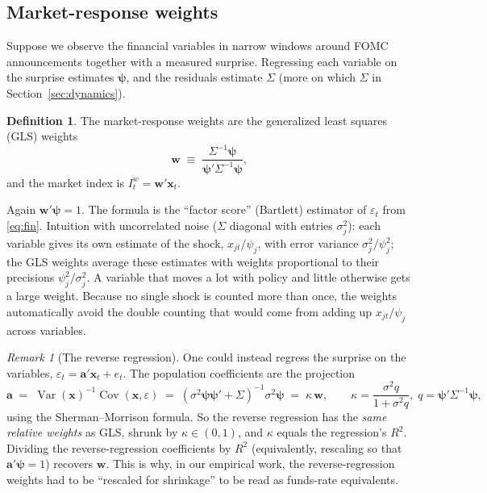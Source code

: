 \documentclass[11pt]{article}
\theoremstyle{definition}
\newtheorem{definition}{Definition}
\theoremstyle{remark}
\newtheorem*{remark}{Remark}
\newcommand{\Var}{\operatorname{Var}}
\newcommand{\Cov}{\operatorname{Cov}}
\newcommand{\bpsi}{\boldsymbol{\psi}}
\newcommand{\bx}{\mathbf{x}}
\newcommand{\bw}{\mathbf{w}}
\newcommand{\ba}{\mathbf{a}}
\begin{document}
\subsection{Market-response weights}

Suppose we observe the financial variables in narrow windows around FOMC announcements together with a measured surprise. Regressing each variable on the surprise estimates $\bpsi$, and the residuals estimate $\Sigma$ (more on which $\Sigma$ in Section~\ref{sec:dynamics}).

\begin{definition}
The market-response weights are the generalized least squares (GLS) weights
\begin{equation}\label{eq:w}
\bw \;\equiv\; \frac{\Sigma^{-1}\bpsi}{\bpsi'\Sigma^{-1}\bpsi},
\end{equation}
and the market index is $I^w_t = \bw'\bx_t$.
\end{definition}

Again $\bw'\bpsi=1$. The formula is the ``factor score'' (Bartlett) estimator of $\varepsilon_t$ from \eqref{eq:fin}. Intuition with uncorrelated noise ($\Sigma$ diagonal with entries $\sigma_j^2$): each variable gives its own estimate of the shock, $x_{jt}/\psi_j$, with error variance $\sigma_j^2/\psi_j^2$; the GLS weights average these estimates with weights proportional to their precisions $\psi_j^2/\sigma_j^2$. A variable that moves a lot with policy and little otherwise gets a large weight. Because no single shock is counted more than once, the weights automatically avoid the double counting that would come from adding up $x_{jt}/\psi_j$ across variables.

\begin{remark}[The reverse regression]
One could instead regress the surprise on the variables, $\varepsilon_t = \ba'\bx_t + e_t$. The population coefficients are the projection
\[
\ba \;=\; \Var(\bx)^{-1}\Cov(\bx,\varepsilon) \;=\; (\sigma^2\bpsi\bpsi'+\Sigma)^{-1}\sigma^2\bpsi \;=\; \kappa\,\bw,\qquad
\kappa = \frac{\sigma^2 q}{1+\sigma^2 q},\; q=\bpsi'\Sigma^{-1}\bpsi,
\]
using the Sherman--Morrison formula. So the reverse regression has the \emph{same relative weights} as GLS, shrunk by $\kappa\in(0,1)$, and $\kappa$ equals the regression's $R^2$. Dividing the reverse-regression coefficients by $R^2$ (equivalently, rescaling so that $\ba'\bpsi=1$) recovers $\bw$. This is why, in our empirical work, the reverse-regression weights had to be ``rescaled for shrinkage'' to be read as funds-rate equivalents.
\end{remark}
\end{document}
